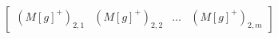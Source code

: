 \documentclass[preview]{standalone}
\begin{document}
\begin{align*}
\begin{bmatrix} (M[g]^+)_{2, 1} & (M[g]^+)_{2, 2} & \ldots & (M[g]^+)_{2, m} \end{bmatrix}
\end{align*}
\end{document}
